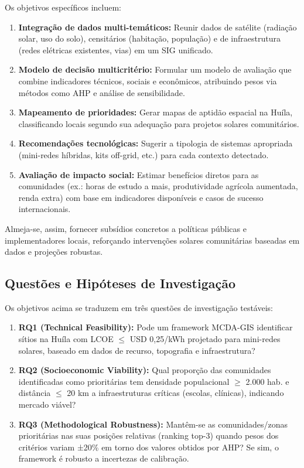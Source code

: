 \documentclass[12pt, a4paper]{article}
\begin{document}
Os objetivos específicos incluem:

\begin{enumerate}
\item \textbf{Integração de dados multi-temáticos:} Reunir dados de satélite (radiação solar, uso do solo), censitários (habitação, população) e de infraestrutura (redes elétricas existentes, vias) em um SIG unificado.
\item \textbf{Modelo de decisão multicritério:} Formular um modelo de avaliação que combine indicadores técnicos, sociais e econômicos, atribuindo pesos via métodos como AHP e análise de sensibilidade.
\item \textbf{Mapeamento de prioridades:} Gerar mapas de aptidão espacial na Huíla, classificando locais segundo sua adequação para projetos solares comunitários.
\item \textbf{Recomendações tecnológicas:} Sugerir a tipologia de sistemas apropriada (mini-redes híbridas, kits off-grid, etc.) para cada contexto detectado.
\item \textbf{Avaliação de impacto social:} Estimar benefícios diretos para as comunidades (ex.: horas de estudo a mais, produtividade agrícola aumentada, renda extra) com base em indicadores disponíveis e casos de sucesso internacionais.
\end{enumerate}

Almeja-se, assim, fornecer subsídios concretos a políticas públicas e implementadores locais, reforçando intervenções solares comunitárias baseadas em dados e projeções robustas.

\subsection{Questões e Hipóteses de Investigação}

Os objetivos acima se traduzem em três questões de investigação testáveis:

\begin{enumerate}
\item \textbf{RQ1 (Technical Feasibility):} Pode um framework MCDA-GIS identificar sítios na Huíla com LCOE $\leq$ USD 0,25/kWh projetado para mini-redes solares, baseado em dados de recurso, topografia e infraestrutura?

\item \textbf{RQ2 (Socioeconomic Viability):} Qual proporção das comunidades identificadas como prioritárias tem densidade populacional $\geq$ 2.000 hab. e distância $\leq$ 20 km a infraestruturas críticas (escolas, clínicas), indicando mercado viável?

\item \textbf{RQ3 (Methodological Robustness):} Mantêm-se as comunidades/zonas prioritárias nas suas posições relativas (ranking top-3) quando pesos dos critérios variam ±20\% em torno dos valores obtidos por AHP? Se sim, o framework é robusto a incertezas de calibração.
\end{enumerate}
\end{document}
